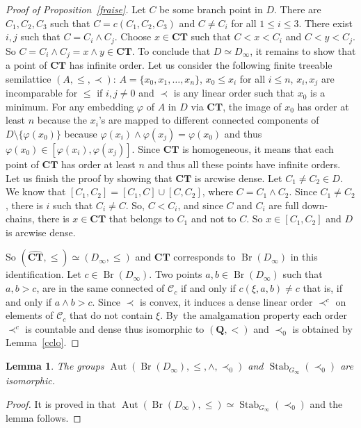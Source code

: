 \documentclass[JEP,XML,SOM,Unicode,NoFloatCountersInSection]{cedram}
\let\mathcal\mathscr
\theoremstyle{plain}
\newtheorem{lem}[thm]{Lemma}
\theoremstyle{definition}
\newcommand{\bCT}{{\boldsymbol{CT}}}
\newcommand{\QQ}{\mathbf{Q}}
\newcommand{\cC}{\mathcal{C}}
\DeclareMathOperator{\Aut}{Aut}
\DeclareMathOperator{\Br}{Br}
\DeclareMathOperator{\Stab}{Stab}
\begin{document}
\begin{proof}[Proof of Proposition~\ref{fraise}]
Let $C$ be some branch point in $D$. There are $C_1,C_2,C_3$ such that $C=c(C_1,C_2,C_3)$ and $C\neq C_i$ for all $1\leq i\leq 3$. There exist $i,j$ such that $C=C_i\wedge C_j$. Choose $x\in\bCT$ such that $C<x<C_i$ and $C<y<C_j$. So $C=C_i\wedge C_j=x\wedge y\in\bCT$. To conclude that $D\simeq D_\infty$, it remains to show that a point of $\bCT$ has infinite order. Let us consider the following finite treeable semilattice $(A,\leq,\prec)$: $A=\{x_0,x_1,\dots,x_n\}$, $x_0\leq x_i$ for all $i\leq n$, $x_i,x_j$ are incomparable for $\leq$ if $i,j\neq0$ and $\prec$ is any linear order such that $x_0$ is a minimum. For any embedding $\varphi$ of $A$ in $D$ via $\bCT$, the image of $x_0$ has order at least $n$ because the $x_i$'s are mapped to different connected components of $D\setminus\{\varphi(x_0)\}$ because $\varphi(x_i)\wedge\varphi(x_j)=\varphi(x_0)$ and thus $\varphi(x_0)\in[\varphi(x_i),\varphi(x_j)]$. Since $\bCT$ is homogeneous, it means that each point of $\bCT$ has order at least $n$ and thus all these points have infinite orders. Let us finish the proof by showing that $\bCT$ is arcwise dense. Let $C_1\neq C_2\in D$. We know that $[C_1,C_2]=[C_1,C]\cup[C,C_2]$, where $C=C_1\wedge C_2$. Since $C_1\neq C_2$, there is $i$ such that $C_i\neq C$. So, $C<C_i$, and since $C$ and $C_i$ are full down-chains, there is $x\in\bCT$ that belongs to $C_1$ and not to $C$. So $x\in[C_1,C_2]$ and $D$ is arcwise dense.

So $(\widehat{\bCT},\leq)\simeq (D_\infty,\leq)$ and $\bCT$ corresponds to $\Br(D_\infty)$ in this identification. Let $c\in\Br(D_\infty)$. Two points $a,b\in\Br(D_\infty)$ such that $a,b>c$, are in the same connected of $\cC_c$ if and only if $c(\xi,a,b)\neq c$ that is, if and only if $a\wedge b>c$. Since $\prec$ is convex, it induces a dense linear order $\prec^c$ on elements of $\cC_c$ that do not contain $\xi$. By~the amalgamation property each order $\prec^c$ is countable and dense thus isomorphic to $(\QQ,<)$ and $\prec_0$ is obtained by Lemma~\ref{cclo}.
\end{proof}

\begin{lem}\label{groupiso} The groups $\Aut(\Br(D_\infty),\leq,\wedge,\prec_0)$ and $\Stab_{G_\infty}(\prec_0)$ are isomorphic.\end{lem}

\begin{proof} It is proved in \cite[Cor.\,5.21]{DM_dendritesII} that $\Aut(\Br(D_\infty),\leq)\simeq \Stab_{G_\infty}(\prec_0)$ and the lemma follows.
\end{proof}
\end{document}
